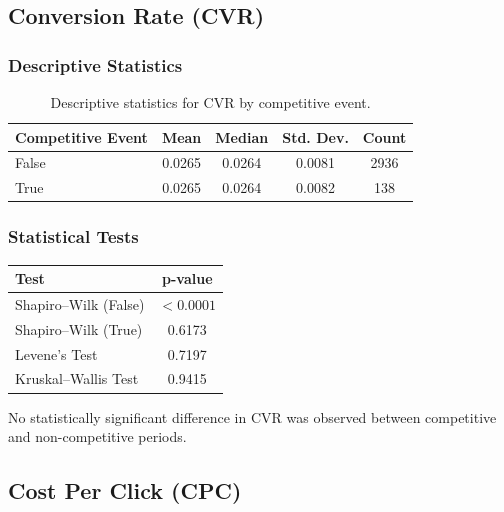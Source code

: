 \subsection{Conversion Rate (CVR)} \label{appendix:competitive_event_performance_analysis_CVR}

\subsubsection{Descriptive Statistics}

\begin{table}[H]
	\centering
	\caption{Descriptive statistics for CVR by competitive event.}
	\begin{tabular}{lcccc}
		\toprule
		Competitive Event & Mean & Median & Std. Dev. & Count\\
		\midrule
		False & 0.0265 & 0.0264 & 0.0081 & 2936\\
		True  & 0.0265 & 0.0264 & 0.0082 & 138\\
		\bottomrule
	\end{tabular}
\end{table}

\subsubsection{Statistical Tests}

\begin{table}[H]
	\centering
	\begin{tabular}{lc}
		\toprule
		Test & p-value\\
		\midrule
		Shapiro--Wilk (False) & $<0.0001$\\
		Shapiro--Wilk (True) & 0.6173\\
		Levene's Test & 0.7197\\
		Kruskal--Wallis Test & 0.9415\\
		\bottomrule
	\end{tabular}
\end{table}

No statistically significant difference in CVR was observed between competitive and non-competitive periods.

\vspace{0.3cm}

\subsection{Cost Per Click (CPC)} \label{appendix:competitive_event_performance_analysis_CPC}

